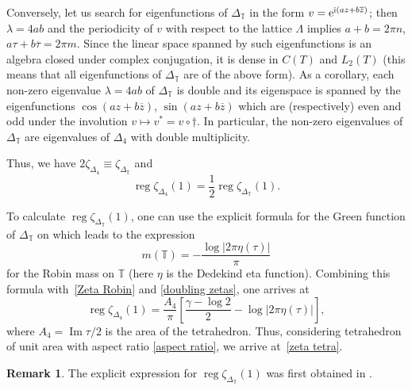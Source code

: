 \documentclass[pdftex]{sigma}
\numberwithin{equation}{section}
\theoremstyle{definition}
\newtheorem{Remark}[Theorem]{Remark}
\begin{document}
 Conversely, let us search for eigenfunctions of $\Delta_\mathbb{T}$ in the form $v={\rm e}^{{\rm i}(az+b\overline{z})}$; then $\lambda=4ab$ and the periodicity of $v$ with respect to the lattice $\Lambda$ implies $a+b=2\pi n$, $a\tau+b\overline{\tau}=2\pi m$. Since the linear space spanned by such eigenfunctions is an algebra closed under complex conjugation, it is dense in $C(T)$ and $L_2(T)$ (this means that all eigenfunctions of $\Delta_\mathbb{T}$ are of the above form). As a corollary, each non-zero eigenvalue $\lambda=4ab$ of $\Delta_\mathbb{T}$ is double and its eigenspace is spanned by the eigenfunctions $\cos (az+b\overline{z})$, $\sin(az+b\overline{z})$ which are (respectively) even and odd under the involution $v\mapsto v^*=v\circ\dag$. In particular, the non-zero eigenvalues of $\Delta_\mathbb{T}$ are eigenvalues of $\Delta_4$ with double multiplicity.

 Thus, we have
$%
2\zeta_{\Delta_4}\equiv\zeta_{\Delta_\mathbb{T}}$ and
\begin{equation}
\label{doubling zetas}
\operatorname{reg}\zeta_{\Delta_4}(1)=\frac{1}{2}\operatorname{reg}\zeta_{\Delta_\mathbb{T}}(1).
\end{equation}



To calculate $\operatorname{reg}\zeta_{\Delta_\mathbb{T}}(1)$, one can use the explicit formula for the Green function of $\Delta_\mathbb{T}$ on \cite[p.~21]{Fay} which leads to the expression
\begin{equation}
\label{Robin mass torus}
m(\mathbb{T})=-\frac{\log |2\pi\eta(\tau)|}{\pi}
\end{equation}
for the Robin mass on $\mathbb{T}$ (here $\eta$ is the Dedekind eta function). Combining this formula with~\eqref{Zeta Robin} and \eqref{doubling zetas}, one arrives at
\[%
\operatorname{reg}\zeta_{\Delta_4}(1)=\frac{A_4}{\pi}\left[\frac{\gamma-\log 2}{2}-\log |2\pi\eta(\tau)|\right],
\]
where $A_4=\operatorname{Im}\tau/2$ is the area of the tetrahedron. Thus, considering tetrahedron of unit area with aspect ratio \eqref{aspect ratio}, we arrive at~\eqref{zeta tetra}.

\begin{Remark}
The explicit expression for $\operatorname{reg}\zeta_{\Delta_\mathbb{T}}(1)$ was first obtained in \cite[equations (A.1)--(A.4), p.~800]{Okikitorus}.
\end{Remark}
\end{document}
